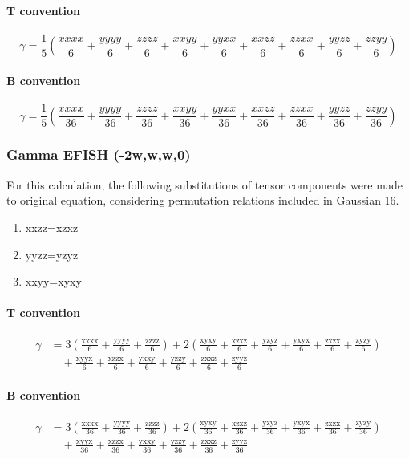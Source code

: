 \documentclass{article}
\begin{document}
	\paragraph{T convention}
	\begin{equation}\label{eq:gamma_kerr_T}
	\gamma = \frac{1}{5}\left(\frac{{xxxx}}{6} + \frac{{yyyy}}{6} + \frac{{zzzz}}{6} + \frac{{xxyy}}{6} + \frac{{yyxx}}{6} + \frac{{xxzz}}{6} + \frac{{zzxx}}{6} + \frac{{yyzz}}{6} + \frac{{zzyy}}{6}\right)
	\end{equation}
	\paragraph{B convention}
	\begin{equation}\label{eq:gamma_kerr_B}
	\gamma = \frac{1}{5}\left(\frac{{xxxx}}{36} + \frac{{yyyy}}{36} + \frac{{zzzz}}{36} + \frac{{xxyy}}{36} + \frac{{yyxx}}{36} + \frac{{xxzz}}{36} + \frac{{zzxx}}{36} + \frac{{yyzz}}{36} + \frac{{zzyy}}{36}\right)
	\end{equation}
	
	\subsubsection{Gamma EFISH (-2w,w,w,0)}
		For this calculation, the following substitutions of tensor components were made to original equation, considering permutation relations included in Gaussian 16.
	\begin{enumerate}
		\item xxzz=xzxz
		\item yyzz=yzyz 
		\item xxyy=xyxy
	\end{enumerate}
	\paragraph{T convention}
	\begin{align}\label{eq:gamma_efish_T}
	\gamma &= 3\left(\frac{\text{xxxx}}{6} + \frac{\text{yyyy}}{6} + \frac{\text{zzzz}}{6}\right) + 2\left(\frac{\text{xyxy}}{6} + \frac{\text{xzxz}}{6} + \frac{\text{yzyz}}{6} + \frac{\text{yxyx}}{6} + \frac{\text{zxzx}}{6} + \frac{\text{zyzy}}{6}\right) \nonumber \\
	&\quad + \frac{\text{xyyx}}{6} + \frac{\text{xzzx}}{6} + \frac{\text{yxxy}}{6} + \frac{\text{yzzy}}{6} + \frac{\text{zxxz}}{6} + \frac{\text{zyyz}}{6}  
	\end{align}
	\paragraph{B convention}
	\begin{align}\label{eq:gamma_efish_B}
	\gamma &= 3\left(\frac{\text{xxxx}}{36} + \frac{\text{yyyy}}{36} + \frac{\text{zzzz}}{36}\right) + 2\left(\frac{\text{xyxy}}{36} + \frac{\text{xzxz}}{36} + \frac{\text{yzyz}}{36} + \frac{\text{yxyx}}{36} + \frac{\text{zxzx}}{36} + \frac{\text{zyzy}}{36}\right) \nonumber \\
	&\quad + \frac{\text{xyyx}}{36} + \frac{\text{xzzx}}{36} + \frac{\text{yxxy}}{36} + \frac{\text{yzzy}}{36} + \frac{\text{zxxz}}{36} + \frac{\text{zyyz}}{36}  
	\end{align}
\end{document}
